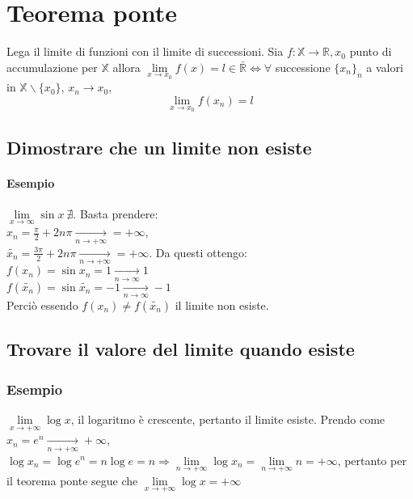\chapter{Teorema ponte}
Lega il limite di funzioni con il limite di successioni. Sia $f:\mathbb{X}\rightarrow\mathbb{R}, x_0$ punto di accumulazione per $\mathbb{X}$ allora $\lim\limits_{x
\rightarrow x_0}f(x)=l\in\mathbb{\bar{R}}\Leftrightarrow\forall$ successione $\{x_n\}_n$ a valori in $\mathbb{X}\backslash\{x_0\}$, $x_n\rightarrow x_0$, 
\begin{equation}
\lim\limits_{x\rightarrow x_0}f(x_n)=l
\end{equation}
\section{Dimostrare che un limite non esiste}
\subsubsection{Esempio}
$\lim\limits_{x\rightarrow\infty}\sin x \:\nexists$. Basta prendere:\\
$x_n=\frac{\pi}{2}+2n\pi\xrightarrow[n\rightarrow+\infty]{}=+\infty$,\\
$\tilde{x_n}=\frac{3\pi}{2}+2n\pi\xrightarrow[n\rightarrow+\infty]{}=+\infty$. Da questi ottengo:\\ 
$f(x_n)=\sin x_n=1\xrightarrow[n\rightarrow \infty]{}1$\\
$f(\tilde{x_n})=\sin \tilde{x_n}=-1\xrightarrow[n\rightarrow \infty]{}-1$\\
Perci\`o essendo $f(x_n)\neq f(\tilde{x_n})$ il limite non esiste.
\section{Trovare il valore del limite quando esiste}
\subsection{Esempio}
$\lim\limits_{x\rightarrow+\infty}\log x$, il logaritmo \`e crescente, pertanto il limite esiste. Prendo come $x_n=e^n\xrightarrow[n\rightarrow+\infty]{}+\infty$,\\
$\log x_n=\log e^n=n\log e=n\Rightarrow\lim\limits_{n\rightarrow+\infty}\log x_n=\lim\limits_{n\rightarrow+\infty} n=+\infty$, pertanto per il teorema ponte segue che 
$\lim\limits_{x\rightarrow+\infty}\log x=+\infty$
